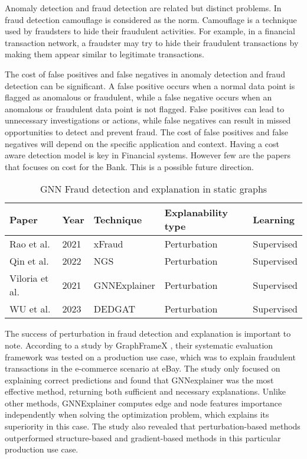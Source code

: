 Anomaly detection and fraud detection are related but distinct problems. In fraud detection camouflage is considered as the norm. Camouflage is a technique used by fraudsters to hide their fraudulent activities. For example, in a financial transaction network, a fraudster may try to hide their fraudulent transactions by making them appear similar to legitimate transactions.

The cost of false positives and false negatives in anomaly detection and fraud detection can be significant. A false positive occurs when a normal data point is flagged as anomalous or fraudulent, while a false negative occurs when an anomalous or fraudulent data point is not flagged. False positives can lead to unnecessary investigations or actions, while false negatives can result in missed opportunities to detect and prevent fraud. The cost of false positives and false negatives will depend on the specific application and context. Having a cost aware detection model is key in Financial systems. However few are the papers that focuses on cost for the Bank. This is a possible future direction.



\begin{table}
\caption{GNN Fraud detection and explanation in static graphs}\label{tab1}
\begin{tabular}{|l|l|l|l|l|}
\hline
Paper &  Year & Technique & Explanability type & Learning\\
\hline
Rao et al.\cite{xfraud} &  2021 & xFraud & Perturbation & Supervised\\
Qin et al.\cite{NGS} &  2022 & NGS  & Perturbation& Supervised\\
Viloria et al.\cite{RAP} & 2021 & GNNExplainer & Perturbation& Supervised\\
 WU et al.\cite{DEDGAT}& 2023 & DEDGAT & Perturbation& Supervised\\
\hline
\end{tabular}
\end{table}

The success of perturbation in fraud detection and explanation is important to note. According to a study by GraphFrameX \cite{graphframex}, their systematic evaluation framework was tested on a production use case, which was to explain fraudulent transactions in the e-commerce scenario at eBay. The study only focused on explaining correct predictions and found that GNNexplainer was the most effective method, returning both sufficient and necessary explanations. Unlike other methods, GNNExplainer computes edge and node features importance independently when solving the optimization problem, which explains its superiority in this case. The study also revealed that perturbation-based methods outperformed structure-based and gradient-based methods in this particular production use case. 


